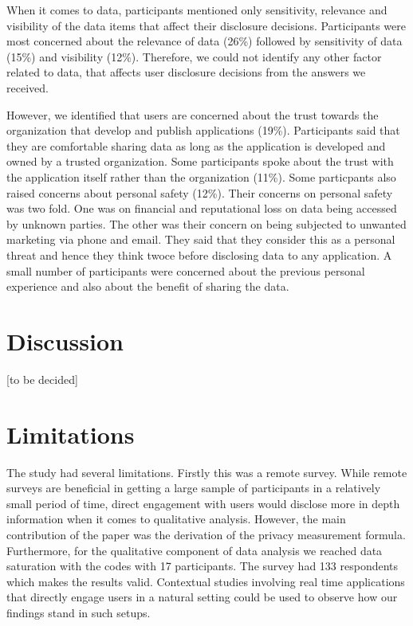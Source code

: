\documentclass[conference]{IEEEtran}
\begin{document}
When it comes to data, participants mentioned only sensitivity, relevance and visibility of the data items that affect their disclosure decisions. Participants were most concerned about the relevance of data (26\%) followed by sensitivity of data (15\%) and visibility (12\%). Therefore, we could not identify any other factor related to data, that affects user disclosure decisions from the answers we received. 

However, we identified that users are concerned about the trust towards the organization that develop and publish applications (19\%). Participants said that they are comfortable sharing data as long as the application is developed and owned by a trusted organization. Some participants spoke about the trust with the application itself rather than the organization (11\%). Some particpants also raised concerns about personal safety (12\%). Their concerns on personal safety was two fold. One was on financial and reputational loss on data being accessed by unknown parties. The other was their concern on being subjected to unwanted marketing via phone and email. They said that they consider this as a personal threat and hence they think twoce before disclosing data to any application. A small number of participants were concerned about the previous personal experience and also about the benefit of sharing the data. 

\section{Discussion}

[to be decided]

\section {Limitations}

The study had several limitations. Firstly this was a remote survey. While remote surveys are beneficial in getting a large sample of participants in a relatively small period of time, direct engagement with users would disclose more in depth information when it comes to qualitative analysis. However, the main contribution of the paper was the derivation of the privacy measurement formula. Furthermore, for the qualitative component of data analysis we reached data saturation with the codes with 17 participants. The survey had 133 respondents which makes the results valid. Contextual studies involving real time applications that directly engage users in a natural setting could be used to observe how our findings stand in such setups.
\end{document}

